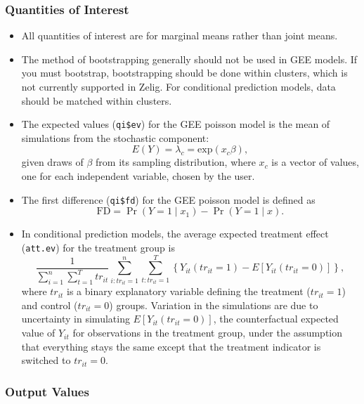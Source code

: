 \subsubsection{Quantities of Interest}
\begin{itemize}
\item All quantities of interest are for marginal means rather than joint means.
\item The method of bootstrapping generally should not be used in GEE models.  If you must bootstrap, bootstrapping should be done within clusters, which is not currently supported in Zelig.  For conditional prediction models, data should be matched within clusters.
\item The expected values ({\tt qi\$ev}) for the GEE poisson model is the mean of simulations from the stochastic component: $$E(Y) =
  \lambda_{c} = \mathrm{exp}(x_{c} \beta),$$ given draws of $\beta$ from
  its sampling distribution, where $x_{c}$ is a vector of values, one for
each independent variable, chosen by the user.

\item The first difference ({\tt qi\$fd}) for the GEE poisson model is defined as
\begin{equation*}
\textrm{FD} = \Pr(Y = 1 \mid x_1) - \Pr(Y = 1 \mid x).
\end{equation*}

\item In conditional prediction models, the average expected treatment
  effect ({\tt att.ev}) for the treatment group is
    \begin{equation*} \frac{1}{\sum_{i=1}^n \sum_{t=1}^T tr_{it}}\sum_{i:tr_{it}=1}^n \sum_{t:tr_{it}=1}^T \left\{ Y_{it}(tr_{it}=1) -
      E[Y_{it}(tr_{it}=0)] \right\},
    \end{equation*}
    where $tr_{it}$ is a binary explanatory variable defining the treatment
    ($tr_{it}=1$) and control ($tr_{it}=0$) groups.  Variation in the
    simulations are due to uncertainty in simulating $E[Y_{it}(tr_{it}=0)]$,
    the counterfactual expected value of $Y_{it}$ for observations in the
    treatment group, under the assumption that everything stays the
    same except that the treatment indicator is switched to $tr_{it}=0$.
\end{itemize}

\subsubsection{Output Values}

